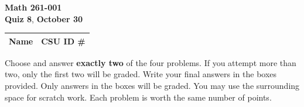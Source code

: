 \documentclass[12pt]{exam}
\newcommand{\class}{Math 261-001}
\newcommand{\examnum}{Quiz 8}
\newcommand{\examdate}{October 30}
\begin{document}
\pagestyle{plain}
\thispagestyle{empty}

\noindent
\textbf{\class}\\
\textbf{\examnum}, \textbf{\examdate}

\setlength{\tabcolsep}{3.5cm}
\renewcommand{\arraystretch}{1.5}
\setlength\extrarowheight{1cm}
\begin{tabular}{ |c|c| }
 \hline
 Name   & CSU ID \#  \\
 \hline
\end{tabular}

\vspace{10pt}

Choose and answer \textbf{exactly two} of the four problems. If you attempt
more than two, only the first two will be graded. Write your final answers
in the boxes provided. Only answers in the boxes will be graded.
You may use the surrounding space for scratch work. Each problem is worth
the same number of points.
\end{document}
